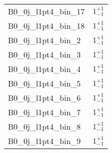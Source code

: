 \begin{tabular}{|l|c|}
B0\_0j\_l1pt4\_bin\_17 & $1^{+1}_{-1}$ \\
B0\_0j\_l1pt4\_bin\_18 & $1^{+1}_{-1}$ \\
B0\_0j\_l1pt4\_bin\_2 & $1^{+1}_{-1}$ \\
B0\_0j\_l1pt4\_bin\_3 & $1^{+1}_{-1}$ \\
B0\_0j\_l1pt4\_bin\_4 & $1^{+1}_{-1}$ \\
B0\_0j\_l1pt4\_bin\_5 & $1^{+1}_{-1}$ \\
B0\_0j\_l1pt4\_bin\_6 & $1^{+1}_{-1}$ \\
B0\_0j\_l1pt4\_bin\_7 & $1^{+1}_{-1}$ \\
B0\_0j\_l1pt4\_bin\_8 & $1^{+1}_{-1}$ \\
B0\_0j\_l1pt4\_bin\_9 & $1^{+1}_{-1}$ \\
\hline
\end{tabular}
